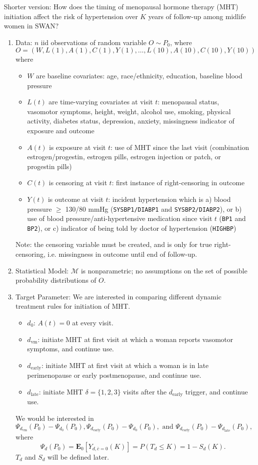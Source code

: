 \documentclass[12pt]{article}
\DeclareMathOperator{\1}{\mathds{1}}
\begin{document}
Shorter version: How does the timing of menopausal hormone therapy (MHT) initiation affect the risk of hypertension over $K$ years of follow-up among midlife women in SWAN?
\begin{enumerate}
	\item Data: $n$ iid observations of random variable $O \sim P_0$, where 
	\[
	O = (W, L(1), A(1), C(1), Y(1), \dots, L(10), A(10), C(10), Y(10))
	\]
	where
	\begin{itemize}
		\item $W$ are baseline covariates: age, race/ethnicity, education, baseline blood pressure
		\item $L(t)$ are time-varying covariates at visit $t$: menopausal status, vasomotor symptoms, height, weight, alcohol use, smoking, physical activity, diabetes status, depression, anxiety, missingness indicator of exposure and outcome 
		\item $A(t)$ is exposure at visit $t$: use of MHT since the last visit (combination estrogen/progestin, estrogen pills, estrogen injection or patch, or progestin pills)
		\item $C(t)$ is censoring at visit $t$: first instance of right-censoring in outcome 
		\item $Y(t)$ is outcome at visit $t$: incident hypertension which is a) blood pressure $\ge$ 130/80 mmHg (\texttt{SYSBP1/DIABP1} and \texttt{SYSBP2/DIABP2}), or b) use of blood pressure/anti-hypertensive medication since visit $t$ (\texttt{BP1} and \texttt{BP2}), or c) indicator of being told by doctor of hypertension (\texttt{HIGHBP})
	\end{itemize}
	Note: the censoring variable must be created, and is only for true right-censoring, i.e. missingness in outcome until end of follow-up. 
	
	\item Statistical Model: $\mathcal M$ is nonparametric; no assumptions on the set of possible probability distributions of $O$.
	\item Target Parameter: We are interested in comparing different dynamic treatment rules for initiation of MHT.
	\begin{itemize}
		\item $d_0$: $A(t) = 0$ at every visit.
		\item $d_\text{vm}$: initiate MHT at first visit at which a woman reports vasomotor symptoms, and continue use.
		\item $d_\text{early}$: initiate MHT at first visit at which a woman is in late perimenopause or early postmenopause, and continue use.
		\item $d_\text{late}$: initiate MHT $\delta = \{1, 2, 3\}$ visits after the $d_\text{early}$ trigger, and continue use.
	\end{itemize}
	We would be interested in 
	\[
	\Psi_{d_\text{vm}}(P_0) - \Psi_{d_0}(P_0), \Psi_{d_\text{early}}(P_0) - \Psi_{d_0}(P_0), \text{ and } \Psi_{d_\text{early}}(P_0) - \Psi_{d_\text{late}}(P_0),
	\]
	where 
	\[
	\Psi_d(P_0) = \mathbf E_0[Y_{d, \overline c = 0}(K)] = P(T_d \le K)= 1 - S_d(K).
	\]
	$T_d$ and $S_d$ will be defined later.
	

\end{enumerate}
\end{document}
